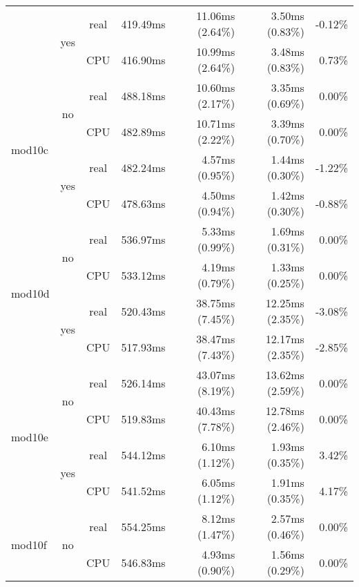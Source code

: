 \documentclass[en]{pracamgr}
\begin{document}
\begin{small}
\begin{longtable}{|l|c|c|r|r|r|r|}
                          \cline{2-7}
                          & \multirow{2}{*}{yes} & real & 419.49ms & 11.06ms (2.64\%) & 3.50ms (0.83\%) & -0.12\% \\*
                          &                      & CPU  & 416.90ms & 10.99ms (2.64\%) & 3.48ms (0.83\%) & 0.73\% \\
\hline
\multirow{4}{*}{mod10c}   & \multirow{2}{*}{no}  & real & 488.18ms & 10.60ms (2.17\%) & 3.35ms (0.69\%) & 0.00\% \\*
                          &                      & CPU  & 482.89ms & 10.71ms (2.22\%) & 3.39ms (0.70\%) & 0.00\% \\*
                          \cline{2-7}
                          & \multirow{2}{*}{yes} & real & 482.24ms & 4.57ms (0.95\%) & 1.44ms (0.30\%) & -1.22\% \\*
                          &                      & CPU  & 478.63ms & 4.50ms (0.94\%) & 1.42ms (0.30\%) & -0.88\% \\
\hline
\multirow{4}{*}{mod10d}   & \multirow{2}{*}{no}  & real & 536.97ms & 5.33ms (0.99\%) & 1.69ms (0.31\%) & 0.00\% \\*
                          &                      & CPU  & 533.12ms & 4.19ms (0.79\%) & 1.33ms (0.25\%) & 0.00\% \\*
                          \cline{2-7}
                          & \multirow{2}{*}{yes} & real & 520.43ms & 38.75ms (7.45\%) & 12.25ms (2.35\%) & -3.08\% \\*
                          &                      & CPU  & 517.93ms & 38.47ms (7.43\%) & 12.17ms (2.35\%) & -2.85\% \\
\hline
\multirow{4}{*}{mod10e}   & \multirow{2}{*}{no}  & real & 526.14ms & 43.07ms (8.19\%) & 13.62ms (2.59\%) & 0.00\% \\*
                          &                      & CPU  & 519.83ms & 40.43ms (7.78\%) & 12.78ms (2.46\%) & 0.00\% \\*
                          \cline{2-7}
                          & \multirow{2}{*}{yes} & real & 544.12ms & 6.10ms (1.12\%) & 1.93ms (0.35\%) & 3.42\% \\*
                          &                      & CPU  & 541.52ms & 6.05ms (1.12\%) & 1.91ms (0.35\%) & 4.17\% \\
\hline
\multirow{4}{*}{mod10f}   & \multirow{2}{*}{no}  & real & 554.25ms & 8.12ms (1.47\%) & 2.57ms (0.46\%) & 0.00\% \\*
                          &                      & CPU  & 546.83ms & 4.93ms (0.90\%) & 1.56ms (0.29\%) & 0.00\% \\*

\end{longtable}
\end{small}
\end{document}
